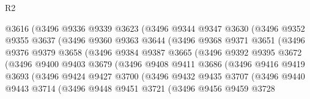 \begin{lexlean}{R2}
\begin{coremodule}
                  @3616
                  (@3496
                    @9336
                    @9339
                    @3623
                    (@3496
                      @9344
                      @9347
                      @3630
                      (@3496
                        @9352
                        @9355
                        @3637
                        (@3496
                          @9360
                          @9363
                          @3644
                          (@3496
                            @9368
                            @9371
                            @3651
                            (@3496
                              @9376
                              @9379
                              @3658
                              (@3496
                                @9384
                                @9387
                                @3665
                                (@3496
                                  @9392
                                  @9395
                                  @3672
                                  (@3496
                                    @9400
                                    @9403
                                    @3679
                                    (@3496
                                      @9408
                                      @9411
                                      @3686
                                      (@3496
                                        @9416
                                        @9419
                                        @3693
                                        (@3496
                                          @9424
                                          @9427
                                          @3700
                                          (@3496
                                            @9432
                                            @9435
                                            @3707
                                            (@3496
                                              @9440
                                              @9443
                                              @3714
                                              (@3496
                                                @9448
                                                @9451
                                                @3721
                                                (@3496
                                                  @9456
                                                  @9459
                                                  @3728

\end{coremodule}
\end{lexlean}
